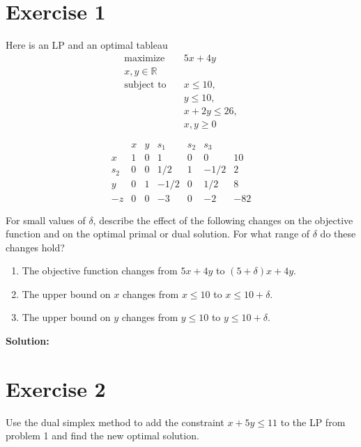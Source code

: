 \documentclass{article}
\begin{document}
\section*{Exercise 1}
Here is an LP and an optimal tableau
\begin{align*}
\text{maximize} \quad & 5x + 4y \\
x, y \in \mathbb{R} & \\
\text{subject to} \quad & x \leq 10, \\
& y \leq 10, \\
& x + 2y \leq 26, \\
& x, y \geq 0
\end{align*}

$$\begin{array}{c|ccccc|c}
& x & y & s_1 & s_2 & s_3 & \\
\hline
x & 1 & 0 & 1 & 0 & 0 & 10 \\
s_2 & 0 & 0 & 1/2 & 1 & -1/2 & 2 \\
y & 0 & 1 & -1/2 & 0 & 1/2 & 8 \\
\hline
-z & 0 & 0 & -3 & 0 & -2 & -82
\end{array}$$

For small values of $\delta$, describe the effect of the following changes on the objective function and on the optimal primal or dual solution. For what range of $\delta$ do these changes hold?

\begin{enumerate}[label=(\alph*)]
    \item The objective function changes from $5x + 4y$ to $(5 + \delta)x + 4y$.

    \item The upper bound on $x$ changes from $x \leq 10$ to $x \leq 10 + \delta$.

    \item The upper bound on $y$ changes from $y \leq 10$ to $y \leq 10 + \delta$.
\end{enumerate}

\textbf{Solution: } \\



\newpage

\section*{Exercise 2}
Use the dual simplex method to add the constraint $x+5y \leq 11$ to the LP from problem 1 and find the new optimal solution. \\
\end{document}
